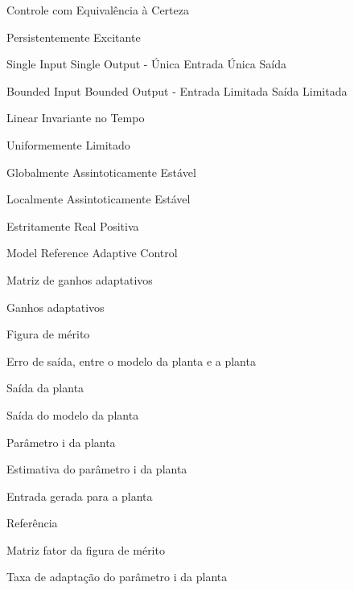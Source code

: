 \documentclass[
	12pt,				%
	openright,			%
	twoside,			%
	a4paper,			%
	english,			%
	french,				%
	spanish,			%
	brazil				%
	]{abntex2}
\begin{document}

\listoftables* %
\thispagestyle{simple}
\begin{siglas}
\thispagestyle{simple}   
  \item[CEC] Controle com Equivalência à Certeza
  \item[PE] Persistentemente Excitante
  \item[SISO] Single Input Single Output - Única Entrada Única Saída
  \item[BIBO] Bounded Input Bounded Output - Entrada Limitada Saída Limitada
  \item[LIT] Linear Invariante no Tempo     
  \item[UL] Uniformemente Limitado
  \item[GAS] Globalmente Assintoticamente Estável
  \item[LAS] Localmente Assintoticamente Estável
  \item[ERP] Estritamente Real Positiva 
  \item[MRAC] Model Reference Adaptive Control
  
\end{siglas}

\begin{simbolos}
\thispagestyle{simple}
  \item[$ \Gamma $] Matriz de ganhos adaptativos
  \item[$ \gamma $] Ganhos adaptativos
  \item[$ \varepsilon $] Figura de mérito
  \item[$ e_0$] Erro de saída, entre o modelo da planta e a planta
  \item[$ y$] Saída da planta
  \item[$\hat{y}$] Saída do modelo da planta
  \item[$\theta^*_i$] Parâmetro i da planta
  \item[$\hat{\theta}_i$] Estimativa do parâmetro i da planta
  \item[$ u$] Entrada gerada para a planta
  \item[$ r$] Referência 
  \item[$ Q$] Matriz fator da figura de mérito
  \item[$\dot{\hat{\theta_i}}$] Taxa de adaptação do parâmetro i da planta
\end{simbolos}
\end{document}
